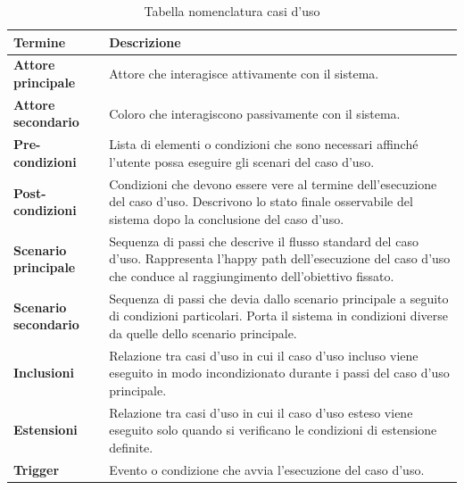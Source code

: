 \documentclass[a4paper,12pt]{article}
\begin{document}
\begin{center}
\small
{} 
\begin{longtable}{|p{}|p{}|}
\caption{Tabella nomenclatura casi d'uso} \label{tab:nomenclatura} \\
\hline
\rowcolor{gray!60}
{\centering \textbf{Termine}\par} &
{\centering \textbf{Descrizione}\par} \\
\hline
\rowcolor{white}
\centering \textbf{Attore principale} & Attore che interagisce attivamente con il sistema. \\
\hline
\rowcolor{gray!20}
\centering \textbf{Attore secondario} & Coloro che interagiscono passivamente con il sistema. \\
\hline
\rowcolor{white}
\centering \textbf{Pre-condizioni} & Lista di elementi o condizioni che sono necessari affinché l'utente possa eseguire gli scenari del caso d'uso. \\
\hline
\rowcolor{gray!20}
\centering \textbf{Post-condizioni} & Condizioni che devono essere vere al termine dell'esecuzione del caso d'uso. Descrivono lo stato finale osservabile del sistema dopo la conclusione del caso d’uso.  \\
\hline
\rowcolor{white}
\centering \textbf{Scenario principale} & Sequenza di passi che descrive il flusso standard del caso d'uso. Rappresenta l'happy path dell'esecuzione del caso d'uso che conduce al raggiungimento dell'obiettivo fissato. \\
\hline
\rowcolor{gray!20}
\centering \textbf{Scenario secondario} & Sequenza di passi che devia dallo scenario principale a seguito di condizioni particolari. Porta il sistema in condizioni diverse da quelle dello scenario principale. \\
\hline
\rowcolor{white}
\centering \textbf{Inclusioni} & Relazione tra casi d'uso in cui il caso d'uso incluso viene eseguito in modo incondizionato durante i passi del caso d'uso principale. \\
\hline
\rowcolor{gray!20}
\centering \textbf{Estensioni} & Relazione tra casi d'uso in cui il caso d'uso esteso viene eseguito solo quando si verificano le condizioni di estensione definite. \\
\hline
\rowcolor{white}
\centering \textbf{Trigger} & Evento o condizione che avvia l’esecuzione del caso d’uso. \\
\hline
\end{longtable}
\end{center}
\end{document}

